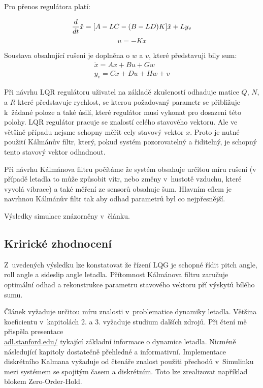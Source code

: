 \documentclass[../report.tex]{subfiles}
\begin{document}
Pro přenos regulátora platí:

\begin{equation}
    \frac{d}{dt}\hat{x} = [A - LC - (B - LD)K]\hat{x} + Ly_v \\
\end{equation}
\begin{equation}
    u = - Kx
\end{equation}


Soustava obsahující rušeni je doplněna o $w$ a $v$, které představuji bily sum:
\begin{align}
    \dot{x} = Ax + Bu + Gw \\
    y_v = Cx + Du + Hw + v
\end{align}


Při návrhu LQR regulátoru uživatel na základě zkušeností odhaduje matice $Q$,
$N$, a $R$ které představuje rychlost, se kterou požadovaný parametr se přibližuje
k žádané poloze a také úsilí, které regulátor musí vykonat pro dosazeni této
polohy. LQR regulátor pracuje se znalostí celého stavového vektoru. Ale ve
většině případu nejsme schopny měřit cely stavový vektor $x$. Proto je nutné
použití Kálmánův filtr, který, pokud systém pozorovatelný a řiditelný, je
schopný tento stavový vektor odhadnout.


Při návrhu Kálmánova filtru počítáme že systém obsahuje určitou míru rušení (v
případě letadla to může způsobit vítr, nebo změny v hustotě vzduchu, které
vyvolá vibrace) a také měření ze sensorů obsahuje šum. Hlavním cílem je navrhnou
Kálmánův filtr tak aby odhad parametrů byl co nejpřesnější.


Výsledky simulace znázorněny v článku.

\subsection{Krirické zhodnocení}

Z uvedených výsledku lze konstatovat že řízení LQG je schopné řídit pitch angle,
roll angle a sideslip angle letadla. Přítomnost Kálmánova filtru zaručuje
optimální odhad a rekonstrukce parametru stavového vektoru pří výskytů bílého
sumu.

Článek vyžaduje určitou míru znalosti v problematice dynamiky letadla. Většina
koeficientu v kapitolách 2. a 3. vyžaduje studium dalších zdrojů. Při čtení mě
přispěla presentace \\
\href{http://adl.stanford.edu/sandbox/groups/aa241x/wiki/e054d/attachments/c53d7/Aircraft%20Flight%20Dynamics%202015_04_13.pdf?sessionID=62f441d3fcc6b4014c66ce9aa5d732f561008d30}{adl.stanford.edu/}
tykající základní informace o dynamice letadla.
Nicméně následující kapitoly dostatečně přehledné a informativní. Implementace
diskrétního Kalmana vyžaduje od čtenáře znalost použiti přechodů v Simulinku
mezi systémem se spojitým časem a diskrétním. Toto lze zrealizovat například blokem Zero-Order-Hold.
\end{document}
